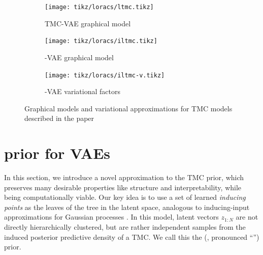 \begin{figure}[t]
\centering
\begin{subfigure}[t]{0.3\textwidth}
    \centering
    \texttt{[image: tikz/loracs/ltmc.tikz]}
    \caption{TMC-VAE graphical model}
\end{subfigure}
\begin{subfigure}[t]{0.34\textwidth}
    \centering
    \texttt{[image: tikz/loracs/iltmc.tikz]}
    \caption{\acronym-VAE graphical model}
\end{subfigure}
\begin{subfigure}[t]{0.34\textwidth}
    \centering
    \texttt{[image: tikz/loracs/iltmc-v.tikz]}
    \caption{\acronym-VAE variational factors}
\end{subfigure}
\caption{Graphical models and variational
approximations for TMC models described in the paper}
\label{fig:graphical-models}
\end{figure}

\section{\acronym\;prior for VAEs}

In this section, we introduce
a novel approximation to the TMC
prior, which preserves many 
desirable properties
like structure and interpretability,
while being computationally viable.
Our key idea is to use a set of
learned \emph{inducing points}
as the leaves of the tree in the latent
space, analogous to inducing-input
approximations for Gaussian processes \citep{snelson2006sparse}. 
In this model, latent vectors $z_{1:N}$
are not directly hierarchically clustered,
but are rather independent samples
from the induced posterior predictive density
of a TMC.
We call this the \acronymexplanation\;(\emph{\acronym}, pronounced ``\acronympronunciation'') prior.

